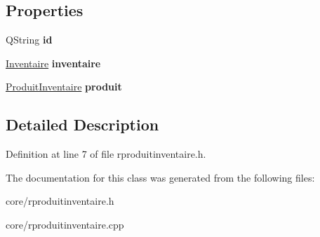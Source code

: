 \subsection*{Properties}
\begin{DoxyCompactItemize}
\item 
\hypertarget{class_r_produit_inventaire_a01ec1f3d8ff649321ba36857b4a22c7d}{
QString {\bfseries id}}
\label{class_r_produit_inventaire_a01ec1f3d8ff649321ba36857b4a22c7d}

\item 
\hypertarget{class_r_produit_inventaire_a195711935b3a646f93016e85d73afab5}{
\hyperlink{class_inventaire}{Inventaire} {\bfseries inventaire}}
\label{class_r_produit_inventaire_a195711935b3a646f93016e85d73afab5}

\item 
\hypertarget{class_r_produit_inventaire_a7bf6f6a1067b5ccfe3b04415229cdfd1}{
\hyperlink{class_produit_inventaire}{ProduitInventaire} {\bfseries produit}}
\label{class_r_produit_inventaire_a7bf6f6a1067b5ccfe3b04415229cdfd1}

\end{DoxyCompactItemize}


\subsection{Detailed Description}


Definition at line 7 of file rproduitinventaire.h.



The documentation for this class was generated from the following files:\begin{DoxyCompactItemize}
\item 
core/rproduitinventaire.h\item 
core/rproduitinventaire.cpp\end{DoxyCompactItemize}
